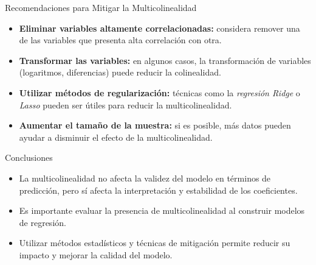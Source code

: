 \documentclass{beamer}
\begin{document}


\begin{frame}{Recomendaciones para Mitigar la Multicolinealidad}
    \begin{itemize}
        \item \textbf{Eliminar variables altamente correlacionadas:} considera remover una de las variables que presenta alta correlación con otra.
        \item \textbf{Transformar las variables:} en algunos casos, la transformación de variables (logaritmos, diferencias) puede reducir la colinealidad.
        \item \textbf{Utilizar métodos de regularización:} técnicas como la \textit{regresión Ridge} o \textit{Lasso} pueden ser útiles para reducir la multicolinealidad.
        \item \textbf{Aumentar el tamaño de la muestra:} si es posible, más datos pueden ayudar a disminuir el efecto de la multicolinealidad.
    \end{itemize}
\end{frame}

\begin{frame}{Conclusiones}
    \begin{itemize}
        \item La multicolinealidad no afecta la validez del modelo en términos de predicción, pero sí afecta la interpretación y estabilidad de los coeficientes.
        \item Es importante evaluar la presencia de multicolinealidad al construir modelos de regresión.
        \item Utilizar métodos estadísticos y técnicas de mitigación permite reducir su impacto y mejorar la calidad del modelo.
    \end{itemize}
\end{frame}
\end{document}
